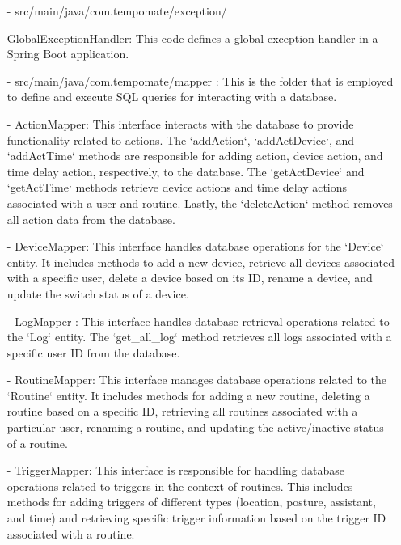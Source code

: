 \begin{enumerate}[label=\arabic*]
\begin{enumerate}[label=\alph*]
\begin{enumerate}
                \item[-] src/main/java/com.tempomate/exception/ \par GlobalExceptionHandler: This code defines a global exception handler in a Spring Boot application.\\
                \item[-] src/main/java/com.tempomate/mapper : This is the folder that is employed to define and execute SQL queries for interacting with a database. \\
                \item[-] ActionMapper: This interface interacts with the database to provide functionality related to actions. The `addAction`, `addActDevice`, and `addActTime` methods are responsible for adding action, device action, and time delay action, respectively, to the database. The `getActDevice` and `getActTime` methods retrieve device actions and time delay actions associated with a user and routine. Lastly, the `deleteAction` method removes all action data from the database. \\
                \item[-] DeviceMapper: This interface handles database operations for the `Device` entity. It includes methods to add a new device, retrieve all devices associated with a specific user, delete a device based on its ID, rename a device, and update the switch status of a device. \\
                \item[-] LogMapper : This interface handles database retrieval operations related to the `Log` entity. The `get\_all\_log` method retrieves all logs associated with a specific user ID from the database.\\
                \item[-] RoutineMapper: This interface manages database operations related to the `Routine` entity. It includes methods for adding a new routine, deleting a routine based on a specific ID, retrieving all routines associated with a particular user, renaming a routine, and updating the active/inactive status of a routine. \\
                \item[-] TriggerMapper: This interface is responsible for handling database operations related to triggers in the context of routines. This includes methods for adding triggers of different types (location, posture, assistant, and time) and retrieving specific trigger information based on the trigger ID associated with a routine. \\

\end{enumerate}
\end{enumerate}
\end{enumerate}
